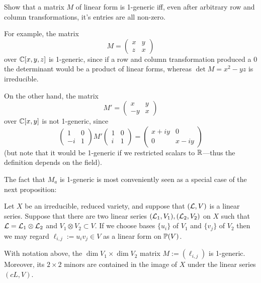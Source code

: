\begin{exercise}
Show that a matrix $M$ of linear form is 1-generic iff, even after arbitrary row and column transformations, it's entries are all non-zero.
\end{exercise}
 For example, the matrix 
$$
M = \begin{pmatrix}
 x &y\\
 z&x
\end{pmatrix}
$$
over ${\mathbb C}[x,y,z]$ is  1-generic, since if a row and column transformation produced a 0 the determinant would be a product of linear forms, whereas
$\det M = x^2-yz$ is irreducible. 

On the other hand, the matrix
$$
M' = \begin{pmatrix}
 x &y\\
 -y&x
\end{pmatrix}
$$
over ${\mathbb C}[x,y]$ is not 1-generic, since
$$
\begin{pmatrix}
1&0\\
-i&1 
\end{pmatrix}
M'
\begin{pmatrix}
 1&0\\
 i&1
\end{pmatrix}
= 
\begin{pmatrix}
 x+iy&0\\
 0&x-iy
\end{pmatrix}
$$
(but note that it would be 1-generic if we restricted scalars to ${\mathbb R}$---thus the definition depends on the field).

The fact that $M_{a}$ is 1-generic is most conveniently seen as a special case of the next proposition:

Let $X$ be
an irreducible, reduced variety, and suppose that $({\mathcal L}, V)$ is a linear series. Suppose that there are two linear series $({\mathcal L}_1,V_1),  ({\mathcal L}_2,V_2)$ on $X$
such that ${\mathcal L} = {\mathcal L}_1\otimes{\mathcal L}_2$ and $V_1\otimes V_2 \subset V$. If we
choose
bases $\{u_i\}$ of $V_1$ and $\{v_j\}$ of $V_2$ then we may regard $\ell_{i,j}:=u_iv_j\in V$
as a linear form on ${\mathbb P}(V)$.

\begin{proposition}\label{some generators}
 With notation above, the $\dim V_1 \times \dim V_2$ matrix 
$M :=  (\ell_{i,j})$ is 1-generic. Moreover, its $2\times 2$ minors are contained in 
the image of $X$ under the linear series $(cL, V)$.
\end{proposition}

